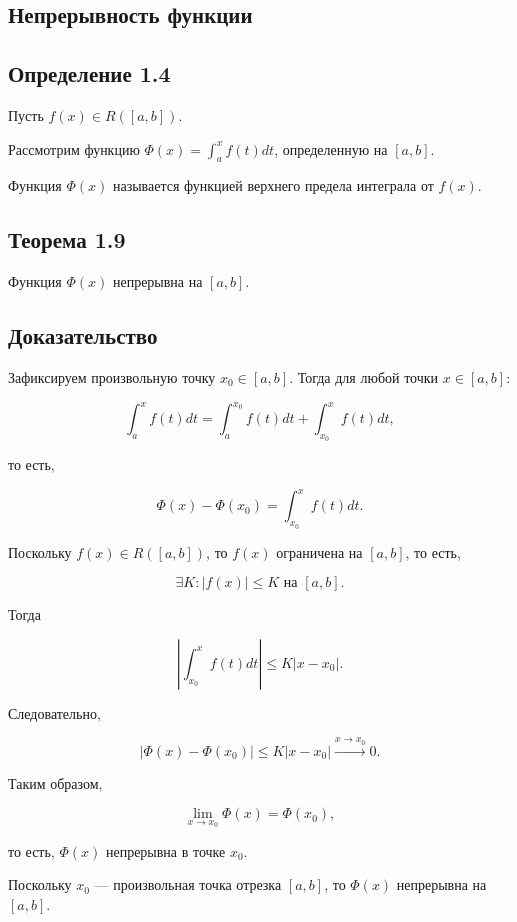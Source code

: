 {
\subsection{Непрерывность  функции }
\subsection*{Определение 1.4}

Пусть \( f(x) \in R([a, b]) \).

Рассмотрим функцию \( \Phi(x) = \int_{a}^{x} f(t) dt \), определенную на \( [a, b] \).

Функция \( \Phi(x) \) называется функцией верхнего предела интеграла от \( f(x) \).


\subsection*{Теорема 1.9}

Функция \( \Phi(x) \) непрерывна на \( [a, b] \).

\subsection*{Доказательство}

Зафиксируем произвольную точку \( x_0 \in [a, b] \). Тогда для любой точки \( x \in [a, b] \):

\[
\int_{a}^{x} f(t)dt = \int_{a}^{x_0} f(t)dt + \int_{x_0}^{x} f(t)dt,
\]

то есть,

\[
\Phi(x) - \Phi(x_0) = \int_{x_0}^{x} f(t)dt.
\]

Поскольку \( f(x) \in R([a, b]) \), то \( f(x) \) ограничена на \( [a, b] \), то есть,

\[
\exists K: |f(x)| \leq K \text{ на } [a, b].
\]

Тогда

\[
\left| \int_{x_0}^{x} f(t)dt \right| \leq K|x - x_0|.
\]



Следовательно,

\[
\left| \Phi(x) - \Phi(x_0) \right| \leq K|x - x_0| \xrightarrow{x \to x_0} 0.
\]

Таким образом,

\[
\lim_{x \to x_0} \Phi(x) = \Phi(x_0),
\]


то есть, \( \Phi(x) \) непрерывна в точке \( x_0 \).

Поскольку \( x_0 \) — произвольная точка отрезка \( [a, b] \), то \( \Phi(x) \) непрерывна на \( [a, b] \).

}
